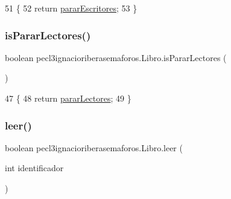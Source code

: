 \begin{DoxyCode}
51                                        \{
52         \textcolor{keywordflow}{return} \mbox{\hyperlink{classpecl3ignacioriberasemaforos_1_1_libro_a3b3677781b08023845a9279e42d6e731}{pararEscritores}};
53     \}
\end{DoxyCode}
\mbox{\label{classpecl3ignacioriberasemaforos_1_1_libro_af6178cea680fdd2f3a42bbc477cf3a51}} 
\subsubsection{\texorpdfstring{is\+Parar\+Lectores()}{isPararLectores()}}
{\footnotesize\ttfamily boolean pecl3ignacioriberasemaforos.\+Libro.\+is\+Parar\+Lectores (\begin{DoxyParamCaption}{ }\end{DoxyParamCaption})\hspace{0.3cm}{\ttfamily [inline]}}


\begin{DoxyCode}
47                                      \{
48         \textcolor{keywordflow}{return} \mbox{\hyperlink{classpecl3ignacioriberasemaforos_1_1_libro_af552bf9166c3f93d14f20bdaca4a0735}{pararLectores}};
49     \}
\end{DoxyCode}
\mbox{\label{classpecl3ignacioriberasemaforos_1_1_libro_a0c0063019147f6501b2216621ee020ce}} 
\subsubsection{\texorpdfstring{leer()}{leer()}}
{\footnotesize\ttfamily boolean pecl3ignacioriberasemaforos.\+Libro.\+leer (\begin{DoxyParamCaption}\item[{int}]{identificador }\end{DoxyParamCaption})\hspace{0.3cm}{\ttfamily [inline]}}


